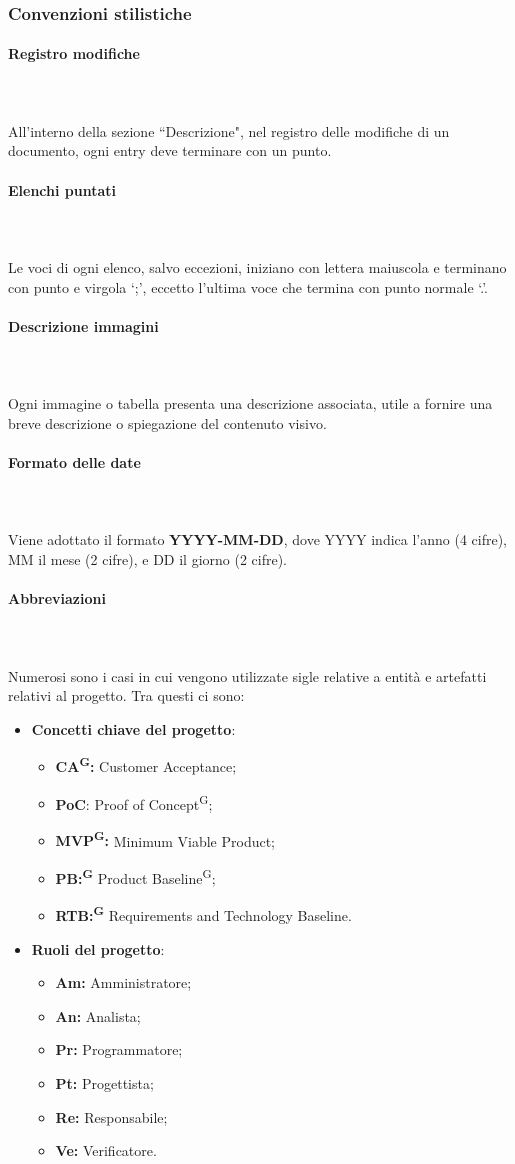 \documentclass[8pt]{article}
\newcommand{\glossterm}[1]{#1\textsuperscript{G}} %
\newcommand{\subsubsubsection}[1]{\paragraph{#1}\mbox{}\\}
\begin{document}
\subsubsection{Convenzioni stilistiche}
\subsubsubsection{Registro modifiche}\\
All'interno della sezione ``Descrizione", nel registro delle modifiche di un documento, ogni entry deve terminare con un punto.
\subsubsubsection{Elenchi puntati}\\
Le voci di ogni elenco, salvo eccezioni, iniziano con lettera maiuscola e terminano con punto e
virgola `;', eccetto l'ultima voce che termina con punto normale `.'.
\subsubsubsection{Descrizione immagini}\\
Ogni immagine o tabella presenta una descrizione associata, utile a fornire una breve descrizione o spiegazione del contenuto visivo.
\subsubsubsection{Formato delle date}\\
Viene adottato il formato \textbf{YYYY-MM-DD}, dove YYYY indica l'anno (4 cifre), MM il mese (2
cifre), e DD il giorno (2 cifre).
\subsubsubsection{Abbreviazioni}\\
Numerosi sono i casi in cui vengono utilizzate sigle relative a entità e artefatti relativi al progetto. Tra questi ci sono:
\begin{itemize}
    \item \textbf{Concetti chiave del progetto}:
        \begin{itemize}
            \item \textbf{\glossterm{CA}:} Customer Acceptance;
            \item \textbf{PoC}: \glossterm{Proof of Concept};
            \item \textbf{\glossterm{MVP}:} Minimum Viable Product;
            \item \textbf{\glossterm{PB:}} Product \glossterm{Baseline};
            \item \textbf{\glossterm{RTB:}} Requirements and Technology Baseline.
        \end{itemize}
    \item \textbf{Ruoli del progetto}:
        \begin{itemize}
            \item \textbf{Am:} Amministratore;
            \item \textbf{An:} Analista;
            \item \textbf{Pr:} Programmatore;
            \item \textbf{Pt:} Progettista;
            \item \textbf{Re:} Responsabile;
            \item \textbf{Ve:} Verificatore.
        \end{itemize}
\end{itemize}
\end{document}
